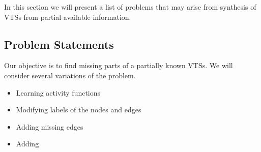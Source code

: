 In this section we will present a list of problems that may arise from
synthesis of VTSs from partial available information.

\subsection{Problem Statements}


Our objective is to find missing parts of a partially known VTSs.
%
We will consider several variations of the problem.
%
\begin{itemize}
\item Learning activity functions
\item Modifying labels of the nodes and edges
\item Adding missing edges
\item Adding
\end{itemize}


